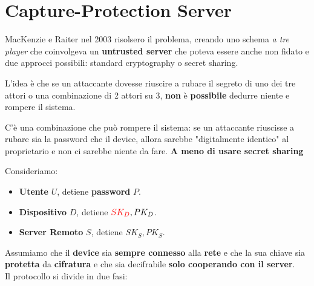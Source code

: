 \section{Capture-Protection Server}
MacKenzie e Raiter nel 2003 risolsero il problema, creando uno schema \textit{a tre player} che coinvolgeva un \textbf{untrusted server} che poteva essere anche non fidato e due approcci possibili: standard cryptography o secret sharing.
\begin{remark}
L'idea è che se un attaccante dovesse riuscire a rubare il segreto di uno dei tre attori o una combinazione di 2 attori su 3, \textbf{non} è \textbf{possibile} dedurre niente e rompere il sistema.
\end{remark}
\begin{remark}
C'è una combinazione che può rompere il sistema: se un attaccante riuscisse a rubare sia la password che il device, allora sarebbe "digitalmente identico" al proprietario e non ci sarebbe niente da fare. \textbf{A meno di usare secret sharing}
\end{remark}
\begin{definition}\label{def:capserver}
Consideriamo:
\begin{itemize}
    \item \textbf{Utente} $U$, detiene \textbf{password} $P$.
    \item \textbf{Dispositivo} $D$, detiene $\textcolor{red}{SK_D}, PK_D$.
    \item \textbf{Server Remoto} $S$, detiene $SK_S, PK_S$.
\end{itemize}
Assumiamo che il \textbf{device} sia \textbf{sempre connesso} alla \textbf{rete} e che la sua chiave sia \textbf{protetta} da \textbf{cifratura} e che sia decifrabile \textbf{solo cooperando con il server}.\\
Il protocollo si divide in due fasi:
\end{definition}
